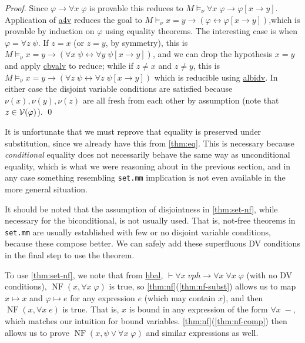 \documentclass[runningheads,a4paper]{llncs}
\newcommand\thlink[1]{\href{http://us.metamath.org/mpegif/#1.html}{\textsf{#1}}}
\newcommand{\vph}{\varphi}
\DeclareMathOperator{\NF}{NF}
\begin{document}
\begin{proof}
Since $\vph\to\forall x\;\vph$ is provable this reduces to $M\models_\nu\forall x\;\vph\to\vph[x\to y]$. Application of \thlink{a4v} reduces the goal to $M\models_\nu x=y\to(\vph\leftrightarrow\vph[x\to y])$,which is provable by induction on $\vph$ using equality theorems. The interesting case is when $\vph=\forall z\;\psi$. If $z=x$ (or $z=y$, by symmetry), this is $M\models_\nu x=y\to(\forall x\;\psi\leftrightarrow\forall y\;\psi[x\to y])$, and we can drop the hypothesis $x=y$ and apply \thlink{cbvalv} to reduce; while if $z\ne x$ and $z\ne y$, this is $M\models_\nu x=y\to(\forall z\;\psi\leftrightarrow\forall z\;\psi[x\to y])$ which is reducible using \thlink{albidv}. In either case the disjoint variable conditions are satisfied because $\nu(x),\nu(y),\nu(z)$ are all fresh from each other by assumption (note that $z\in{\cal V}(\vph)$).  
\qed\end{proof}

\begin{remark}
It is unfortunate that we must reprove that equality is preserved under substitution, since we already have this from \autoref{thm:eq}. This is necessary because {\em conditional} equality does not necessarily behave the same way as unconditional equality, which is what we were reasoning about in the previous section, and in any case something resembling \texttt{set.mm} implication is not even available in the more general situation.
\end{remark}

\begin{remark}
It should be noted that the assumption of disjointness in \autoref{thm:set-nf}, while necessary for the biconditional, is not usually used. That is, not-free theorems in \texttt{set.mm} are usually established with few or no disjoint variable conditions, because these compose better. We can safely add these superfluous DV conditions in the final step to use the theorem. 
\end{remark}

To use \autoref{thm:set-nf}, we note that from \thlink{hbal}, $\vdash\forall x\;vph\to\forall x\;\forall x\;\vph$ (with no DV conditions), $\NF(x,\forall x\;\vph)$ is true, so \autoref{thm:nf}(\ref{thm:nf-subst}) allows us to map $x\mapsto x$ and $\vph\mapsto e$ for any expression $e$ (which may contain $x$), and then $\NF(x,\forall x\; e)$ is true. That is, $x$ is bound in any expression of the form $\forall x\;-$, which matches our intuition for bound variables. \autoref{thm:nf}(\ref{thm:nf-comp}) then allows us to prove $\NF(x,\psi\lor\forall x\;\vph)$ and similar expressions as well.
\end{document}
